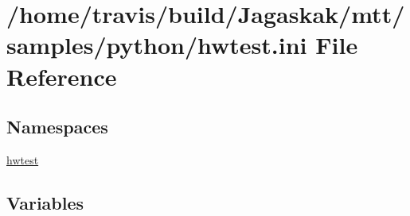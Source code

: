 \hypertarget{hwtest_8ini}{\section{/home/travis/build/\-Jagaskak/mtt/samples/python/hwtest.ini File Reference}
\label{hwtest_8ini}
}
\subsection*{Namespaces}
\begin{DoxyCompactItemize}
\item 
\hyperlink{namespacehwtest}{hwtest}
\end{DoxyCompactItemize}
\subsection*{Variables}
